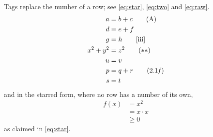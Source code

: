 \documentclass{article}
\begin{document}
Tags replace the number of a row; see \eqref{eq:star}, \eqref{eq:two} and \ref{eq:raw}.
\begin{align}
a &= b + c \tag{A} \label{eq:star} \\
d &= e + f \\
g &= h \tag*{[iii]} \label{eq:raw} \\
x^2 + y^2 &= z^2 \tag{$\ast\ast$} \\
u &= v \notag \\
p &= q + r \tag{2.1\textit{f}} \\
s &= t \label{eq:two}
\end{align}
and in the starred form, where no row has a number of its own,
\begin{align*}
f(x) &= x^2 \tag{B'} \\
&= x \cdot x \\
&\ge 0 \tag*{Q.E.D.}
\end{align*}
as claimed in \eqref{eq:star}.
\end{document}
